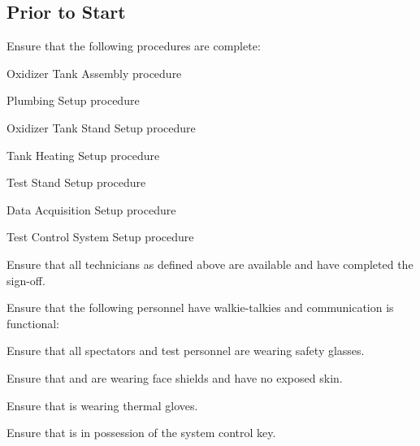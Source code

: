 \newpage
\subsection{Prior to Start}
\begin{checklist}
    \item Ensure that the following procedures are complete:
    \begin{checklist}
        \item Oxidizer Tank Assembly procedure
        \item Plumbing Setup procedure
        \item Oxidizer Tank Stand Setup procedure
        \item Tank Heating Setup procedure
        \item Test Stand Setup procedure
        \item Data Acquisition Setup procedure
        \item Test Control System Setup procedure
    \end{checklist}
    \item Ensure that all technicians as defined above are available and have completed the sign-off.
    \item Ensure that the following personnel have walkie-talkies and communication is functional:
    \begin{checklist}
        \item \ops{}
        \item \primary{}
        \item \secondary{}
        \item \daq{}
        \item \heat{}
        \item \peri{}
        \item \perii{}
    \end{checklist}
    \item Ensure that all spectators and test personnel are wearing safety glasses.
    \item Ensure that \primary{} and \secondary{} are wearing face shields and have no exposed skin.
    \item Ensure that \primary{} is wearing thermal gloves.
    \item Ensure that \secondary{} is in possession of the system control key.
\end{checklist}
\setcounter{checklistnum}{0}

